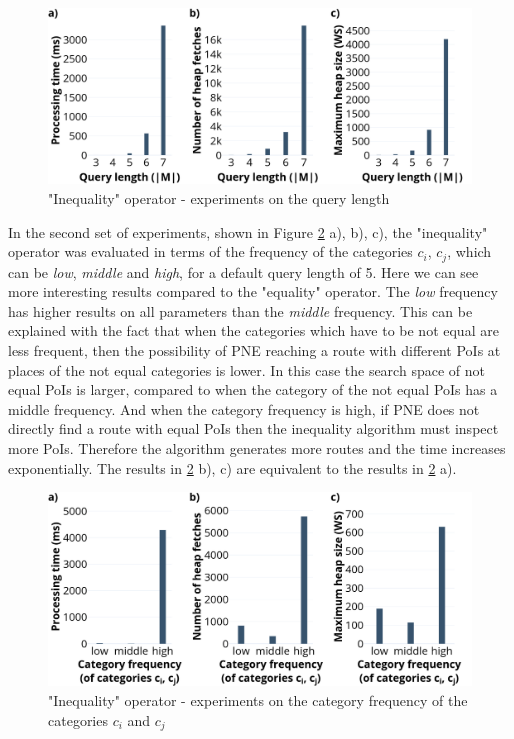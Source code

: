 \begin{figure}[H]
	\includegraphics[scale=0.33]{images/neo_length_30.png}
	\centering
	\caption{"Inequality" operator - experiments on the query length}
	\label{fig:neo_length}
\end{figure}

In the second set of experiments, shown in Figure \ref{fig:neo_frequency} a), b), c), the "inequality" operator was evaluated in terms of the frequency of the categories $c_i$, $c_j$, which can be \textit{low}, \textit{middle} and \textit{high}, for a default query length of 5.  
Here we can see more interesting results compared to the "equality" operator. The \textit{low} frequency has higher results on all parameters than the \textit{middle} frequency. This can be explained with the fact that when the categories which have to be not equal are less frequent, then the possibility of PNE reaching a route with different PoIs at places of the not equal categories is lower. In this case the search space of not equal PoIs is larger, compared to when the category of the not equal PoIs has a middle frequency. And when the category frequency is high, if PNE does not directly find a route with equal PoIs then the inequality algorithm must inspect more PoIs. Therefore the algorithm generates more routes and the time increases exponentially. 
The results in \ref{fig:neo_frequency} b), c) are equivalent to the results in \ref{fig:neo_frequency} a). 

\begin{figure}[H]
	\includegraphics[scale=0.33]{images/neo_frequency_30.png}
	\centering
	\caption{"Inequality" operator - experiments on the category frequency of the categories $c_i$ and $c_j$}
	\label{fig:neo_frequency}
\end{figure}

